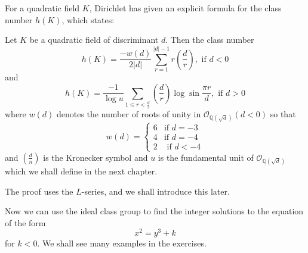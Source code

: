For a quadratic field $K$, Dirichlet has given an explicit formula for the class number $h(K)$, which states:
\begin{theorem} Let $K$ be a quadratic field of discriminant $d$. Then the class number
$$h(K)=\frac{-w(d)}{2|d|}\sum_{r=1}^{|d|-1}r\left(\frac{d}{r}\right), \text{ if } d<0$$
and
$$h(K)=\frac{-1}{\log{u}}\sum_{1 \le r<\frac{d}{2}}\left(\frac{d}{r}\right)\log{\sin{\frac{\pi r}{d}}},
\text{ if } d>0$$
where $w(d)$ denotes the number of roots of unity in $\mathcal{O}_{\mathbb{Q}(\sqrt{d})}(d<0)$ so that
\begin{equation*}
w(d)= \left\{
\begin{array}{ll}
6 & \text{if } d=-3\\
4 & \text{if } d=-4 \\
2 & \text{ if } d<-4
\end{array} \right.
\end{equation*}
and $(\frac{d}{n})$ is the Kronecker symbol and $u$ is the fundamental unit of $\mathcal{O}_{\mathbb{Q}(\sqrt{d})}$ which we shall define in the next chapter.
\end{theorem}
The proof uses the $L$-series, and we shall introduce this later.

Now we can use the ideal class group to find the integer solutions to the equation of the form
$$x^2=y^3+k$$
for $k <0$. We shall see many examples in the exercises.



